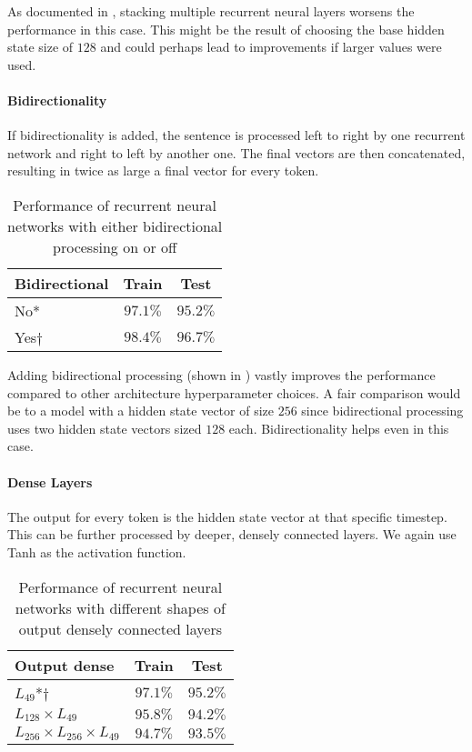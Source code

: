 \documentclass[11pt,a4paper]{article}
\newcommand{\dagg}{$\dagger{}$}
\begin{document}
As documented in , stacking multiple recurrent neural layers worsens the performance in this case. This might be the result of choosing the base hidden state size of $128$ and could perhaps lead to improvements if larger values were used.

\paragraph{Bidirectionality}

If bidirectionality is added, the sentence is processed left to right by one recurrent network and right to left by another one. The final vectors are then concatenated, resulting in twice as large a final vector for every token.

\begin{table}[ht]
    \centering
    \begin{tabular}{lcc}
    \toprule
    Bidirectional & Train & Test \\
    \midrule
    No* & $97.1\%$ & $95.2\%$ \\
    Yes\dagg & $98.4\%$ & $96.7\%$ \\
    \bottomrule
    \end{tabular}
    \caption{\label{tab:bidir} Performance of recurrent neural networks with either bidirectional processing on or off}
\end{table}

Adding bidirectional processing (shown in ) vastly improves the performance compared to other architecture hyperparameter choices. A fair comparison would be to a model with a hidden state vector of size $256$ since bidirectional processing uses two hidden state vectors sized $128$ each. Bidirectionality helps even in this case.

\paragraph{Dense Layers}

The output for every token is the hidden state vector at that specific timestep. This can be further processed by deeper, densely connected layers. We again use Tanh as the activation function.

\begin{table}[ht]
    \centering
    \begin{tabular}{lcc}
    \toprule
    Output dense & Train & Test \\
    \midrule
    $L_{49}$*\dagg & $97.1\%$ & $95.2\%$ \\
    $L_{128}\times L_{49}$ & $95.8\%$ & $94.2\%$ \\
    $L_{256}\times L_{256}\times L_{49}$ & $94.7\%$ & $93.5\%$ \\
    \bottomrule
    \end{tabular}
    \caption{\label{tab:rnn_dense} Performance of recurrent neural networks with different shapes of output densely connected layers}
\end{table}
\end{document}
